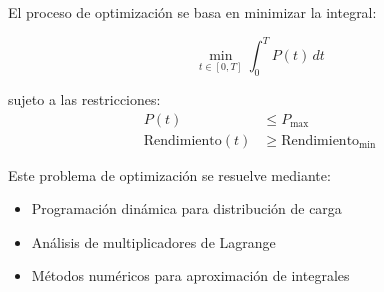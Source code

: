 El proceso de optimización se basa en minimizar la integral:

\[ \min_{t \in [0,T]} \int_{0}^{T} P(t)\,dt \]

sujeto a las restricciones:
\begin{align*}
    P(t) &\leq P_{\text{max}} \\
    \text{Rendimiento}(t) &\geq \text{Rendimiento}_{\text{min}}
\end{align*}

Este problema de optimización se resuelve mediante:
\begin{itemize}
    \item Programación dinámica para distribución de carga
    \item Análisis de multiplicadores de Lagrange
    \item Métodos numéricos para aproximación de integrales
\end{itemize}